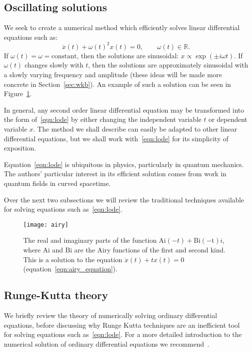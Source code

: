 \subsection{Oscillating solutions}
We seek to create a numerical method which efficiently solves linear differential equations such as:
\begin{equation}
  \ddot{x}(t) + {\omega(t)}^2x(t) = 0,\qquad \omega(t)\in\mathbb{R}.
  \label{eqn:lode}
\end{equation}
If $\omega(t)=\omega = \mathrm{constant}$, then the solutions are sinusoidal: $x\propto \exp{(\pm i \omega t)}$. If $\omega(t)$ changes slowly with $t$, then the solutions are approximately sinusoidal with a slowly varying frequency and amplitude (these ideas will be made more concrete in Section~\ref{sec:wkb}). An example of such a solution can be seen in Figure~\ref{fig:airy}.

In general, any second order linear differential equation may be transformed into the form of~\eqref{eqn:lode} by either changing the independent variable $t$ or dependent variable $x$. The method we shall describe can easily be adapted to other linear differential equations, but we shall work with~\eqref{eqn:lode} for its simplicity of exposition.

Equation~\eqref{eqn:lode} is ubiquitous in physics, particularly in quantum mechanics. The authors' particular interest in its efficient solution comes from work in quantum fields in curved spacetime.



Over the next two subsections we will review the traditional techniques available for solving equations such as~\eqref{eqn:lode}.

\begin{figure}[]
  \centering
  \texttt{[image: airy]}
  \caption{The real and imaginary parts of the function $\mathrm{Ai}(-t) + \mathrm{Bi(-t)} i$, where $\mathrm{Ai}$ and $\mathrm{Bi}$ are the Airy functions of the first and second kind. This is a solution to the equation ${\ddot{x}(t) + t x(t) = 0}$ (equation~\ref{eqn:airy_equation}).\label{fig:airy}}
\end{figure}


\subsection{Runge-Kutta theory}
\label{sec:rk}
We briefly review the theory of numerically solving ordinary differential equations, before discussing why Runge Kutta techniques are an inefficient tool for solving equations such as~\eqref{eqn:lode}.
For a more detailed introduction to the numerical solution of ordinary differential equations we recommend~\cite{Press+2007}.

